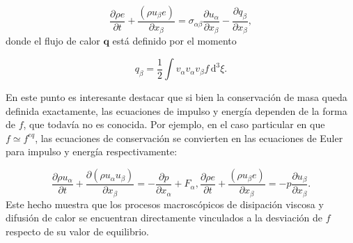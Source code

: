 \begin{equation}
	\dfrac{\partial \rho e}{\partial t} + \dfrac{(\rho u_{\beta} e)}{\partial x_{\beta}} = \sigma_{\alpha\beta} \dfrac{\partial u_{\alpha}}{\partial x_{\beta}} - \dfrac{\partial q_{\beta}}{\partial x_{\beta}},
\end{equation}
donde el flujo de calor $\bm{q}$ est\'a definido por el momento

\begin{equation}
	q_{\beta} = \dfrac{1}{2} \int v_{\alpha} v_{\alpha} v_{\beta} f \, \mbox{d}^3 \xi.
\end{equation}


En este punto es interesante destacar que si bien la conservaci\'on de masa queda definida exactamente, las ecuaciones de impulso y energ\'ia dependen de la forma de $f$, que todav\'ia no es conocida. Por ejemplo, en el caso particular en que $f \simeq f^{eq}$, las ecuaciones de conservaci\'on se convierten en las ecuaciones de Euler para impulso y energ\'ia respectivamente:

\begin{subequations}
	\begin{equation}
	 	\dfrac{\partial \rho u_{\alpha}}{\partial t} 
	  + \dfrac{\partial (\rho u_{\alpha} u_{\beta})}{\partial x_{\beta}} 
	  =	-\dfrac{\partial p}{\partial x_{\alpha}} + F_{\alpha} ,	
	\end{equation}
	\begin{equation}
		\dfrac{\partial \rho e}{\partial t} 
	  + \dfrac{(\rho u_{\beta} e)}{\partial x_{\beta}} 
	  = -p \dfrac{\partial u_{\beta}}{\partial x_{\beta}}.
	\end{equation}
	\label{eq:macro_euler}	
\end{subequations}
Este hecho muestra que los procesos macrosc\'opicos de disipaci\'on viscosa y difusi\'on de calor se encuentran directamente vinculados a la desviaci\'on de $f$ respecto de su valor de equilibrio.



